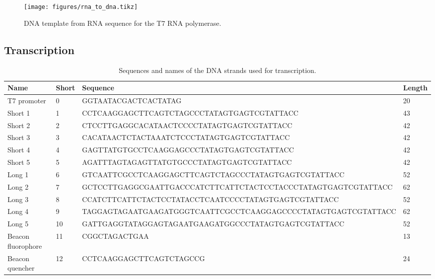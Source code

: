 \begin{figure}[h]
\centering
\texttt{[image: figures/rna\_to\_dna.tikz]}
\caption{DNA template from RNA sequence for the T7 RNA polymerase.}
\label{rna_to_dna_process}
\end{figure}

\subsection{Transcription}

\begin{table}
\begin{adjustbox}{width=\columnwidth}
\begin{tabular}{llll}
\hline
\textbf{Name}      & \textbf{Short} & \textbf{Sequence}                                           & \textbf{Length} \\
\hline
T7 promoter        & 0          & GGTAATACGACTCACTATAG                                           & 20     \\
Short 1            & 1          & CCTCAAGGAGCTTCAGTCTAGCCCTATAGTGAGTCGTATTACC                    & 43     \\
Short 2            & 2          & CTCCTTGAGGCACATAACTCCCCTATAGTGAGTCGTATTACC                     & 42     \\
Short 3            & 3          & CACATAACTCTACTAAATCTCCCTATAGTGAGTCGTATTACC                     & 42     \\
Short 4            & 4          & GAGTTATGTGCCTCAAGGAGCCCTATAGTGAGTCGTATTACC                    & 42     \\
Short 5            & 5          & AGATTTAGTAGAGTTATGTGCCCTATAGTGAGTCGTATTACC                     & 42     \\
Long 1             & 6          & GTCAATTCGCCTCAAGGAGCTTCAGTCTAGCCCTATAGTGAGTCGTATTACC           & 52     \\
Long 2             & 7          & GCTCCTTGAGGCGAATTGACCCATCTTCATTCTACTCCTACCCTATAGTGAGTCGTATTACC & 62     \\
Long 3             & 8          & CCATCTTCATTCTACTCCTATACCTCAATCCCCTATAGTGAGTCGTATTACC           & 52     \\
Long 4             & 9          & TAGGAGTAGAATGAAGATGGGTCAATTCGCCTCAAGGAGCCCCTATAGTGAGTCGTATTACC & 62     \\
Long 5             & 10         & GATTGAGGTATAGGAGTAGAATGAAGATGGCCCTATAGTGAGTCGTATTACC           & 52     \\
Beacon fluorophore & 11         & CGGCTAGACTGAA                                                  & 13     \\
Beacon quencher    & 12         & CCTCAAGGAGCTTCAGTCTAGCCG                                       & 24 \\
\hline
\end{tabular}
\end{adjustbox}
\caption{Sequences and names of the DNA strands used for transcription.}
\label{dna_strands}
\end{table}

